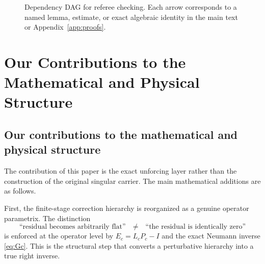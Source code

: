 \documentclass[11pt]{article}
\numberwithin{equation}{section}
\begin{document}
\begin{figure}[ht]
\centering
{}
\caption{Dependency DAG for referee checking.  Each arrow corresponds to a named lemma, estimate, or exact algebraic identity in the main text or Appendix~\ref{app:proofs}.}
\label{fig:dependency}
\end{figure}

\section{Our Contributions to the Mathematical and Physical Structure}\label{sec:contrib}

\subsection{Our contributions to the mathematical and physical structure}
The contribution of this paper is the exact unforcing layer rather than the construction of the original singular carrier.  The main mathematical additions are as follows.

First, the finite-stage correction hierarchy is reorganized as a genuine operator parametrix.  The distinction
\[
\text{``residual becomes arbitrarily flat''}
\quad\neq\quad
\text{``the residual is identically zero''}
\]
is enforced at the operator level by \(E_c=L_cP_c-I\) and the exact Neumann inverse \eqref{eq:Gc}.  This is the structural step that converts a perturbative hierarchy into a true right inverse.
\end{document}

